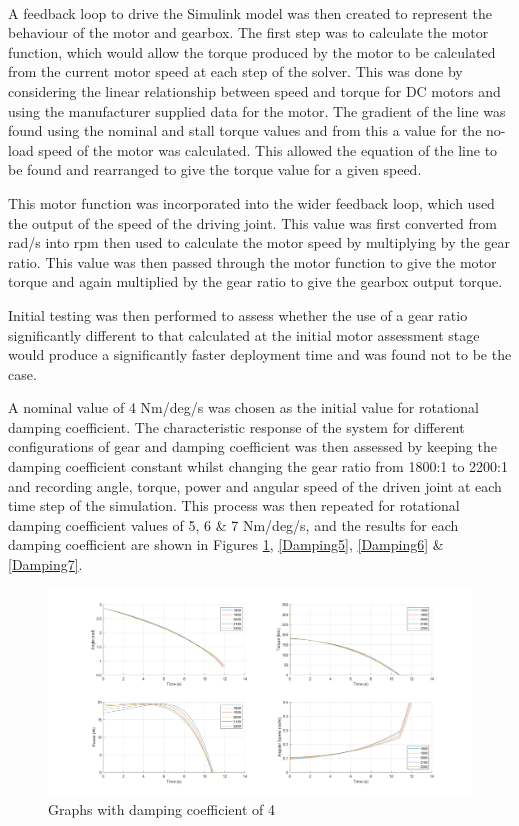 \documentclass[a4paper]{article}
\begin{document}
\paragraph{}
A feedback loop to drive the Simulink model was then created to represent the behaviour of the motor and gearbox. The first step was to calculate the motor function, which would allow the torque produced by the motor to be calculated from the current motor speed at each step of the solver. This was done by considering the linear relationship between speed and torque for DC motors and using the manufacturer supplied data for the motor. The gradient of the line was found using the nominal and stall torque values and from this a value for the no-load speed of the motor was calculated. This allowed the equation of the line to be found and rearranged to give the torque value for a given speed.


This motor function was incorporated into the wider feedback loop, which used the output of the speed of the driving joint. This value was first converted from rad/s into rpm then used to calculate the motor speed by multiplying by the gear ratio. This value was then passed through the motor function to give the motor torque and again multiplied by the gear ratio to give the gearbox output torque.


Initial testing was then performed to assess whether the use of a gear ratio significantly different to that calculated at the initial motor assessment stage would produce a significantly faster deployment time and was found not to be the case.


A nominal value of 4 Nm/deg/s was chosen as the initial value for rotational damping coefficient. The characteristic response of the system for different configurations of gear and damping coefficient was then assessed by keeping the damping coefficient constant whilst changing the gear ratio from 1800:1 to 2200:1 and recording angle, torque, power and angular speed of the driven joint at each time step of the simulation. This process was then repeated for rotational damping coefficient values of 5, 6 \& 7 Nm/deg/s, and the results for each damping coefficient are shown in Figures \ref{Damping4}, \ref{Damping5}, \ref{Damping6} \& \ref{Damping7}.


\begin{figure}[H]
\centering
\includegraphics[width=1\textwidth]{Damping_4.png}
    \caption{\label{Damping4} Graphs with damping coefficient of 4}
\end{figure}
\end{document}
